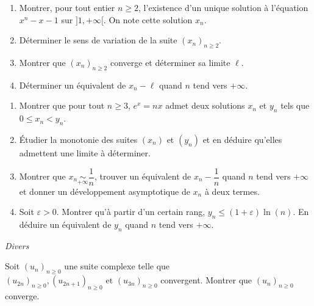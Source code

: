\documentclass[a4paper,10pt]{report}
\begin{document}
\begin{Exa}
\begin{enumerate}
\item Montrer, pour tout entier $n \geq 2$,  l'existence d'un unique solution à l'équation $x^n-x-1$ sur $]1, + \infty[$. On note cette solution $x_n$.
\item Déterminer le sens de variation de la suite $(x_n)_{n \geq 2}$.
\item Montrer que  $(x_n)_{n \geq 2}$ converge et déterminer sa limite $\ell$.
\item Déterminer un équivalent de $x_n - \ell$ quand $n$ tend vers $+ \infty$.
\end{enumerate}
\end{Exa}




\begin{Exa}[\ding{80}] \begin{enumerate}
\item Montrer que pour tout $n \geq 3$, $e^x=nx$ admet deux solutions $x_n$ et $y_n$ tels que $0 \leq x_n <y_n$.
\item Étudier la monotonie des suites $(x_n)$ et $(y_n)$ et en déduire qu'elles admettent une limite à déterminer.
\item Montrer que $x_n \underset{+ \infty}{\sim} \dfrac{1}{n}$, trouver un équivalent de $x_n - \dfrac{1}{n}$ quand $n$ tend vers $+ \infty$ et donner un développement asymptotique de $x_n$ à deux termes.
\item Soit $\varepsilon >0$. Montrer qu'à partir d'un certain rang, $y_n \leq (1+ \varepsilon) \ln(n)$. En déduire un équivalent de $y_n$ quand $n$ tend vers $+ \infty$.
\end{enumerate}
\end{Exa}



\medskip

\begin{center}
\textit{{ {\large Divers}}}
\end{center}

\medskip

\begin{Exa} Soit $(u_n)_{n \geq 0}$ une suite complexe telle que $(u_{2n})_{n \geq 0},(u_{2n + 1})_{n \geq 0}{\text{ et }}(u_{3n})_{n \geq 0}$ convergent. Montrer que $(u_n)_{n \geq 0}$ converge.
\end{Exa} 
\end{document}
